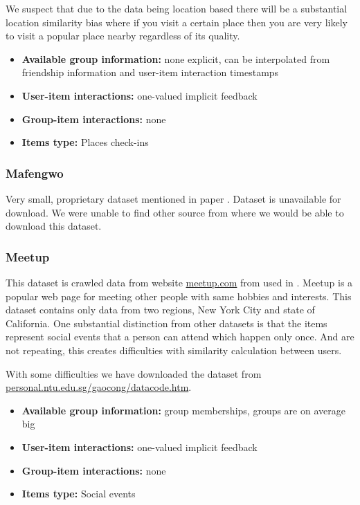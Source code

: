We suspect that due to the data being location based there will be a substantial location similarity bias where if you visit a certain place then you are very likely to visit a popular place nearby regardless of its quality.

\begin{itemize}
    \item \textbf{Available group information:} none explicit, can be interpolated from friendship information and user-item interaction timestamps
    \item \textbf{User-item interactions:} one-valued implicit feedback
    \item \textbf{Group-item interactions:} none
    \item \textbf{Items type:} Places check-ins
\end{itemize}


\subsubsection{Mafengwo} \label{subsubsec:04_group_datasets.overview.mafengwo}
Very small, proprietary dataset mentioned in paper  \cite{attentative_group_recommendation}. Dataset is unavailable for download. We were unable to find other source from where we would be able to download this dataset.


\subsubsection{Meetup} \label{subsubsec:04_group_datasets.overview.meetup}
This dataset is crawled data from website \href{https://www.meetup.com}{meetup.com} from \cite{meetup_origin} used in \cite{meetup_plancast}. Meetup is a popular web page for meeting other people with same hobbies and interests. This dataset contains only data from two regions, New York City and state of California. One substantial distinction from other datasets is that the items represent social events that a person can attend which happen only once. And are not repeating, this creates difficulties with similarity calculation between users.

With some difficulties we have downloaded the dataset from
\newline\href{https://personal.ntu.edu.sg/gaocong/datacode.htm}{personal.ntu.edu.sg/gaocong/datacode.htm}.

\begin{itemize}
    \item \textbf{Available group information:} group memberships, groups are on average big
    \item \textbf{User-item interactions:} one-valued implicit feedback
    \item \textbf{Group-item interactions:} none
    \item \textbf{Items type:} Social events
\end{itemize}


